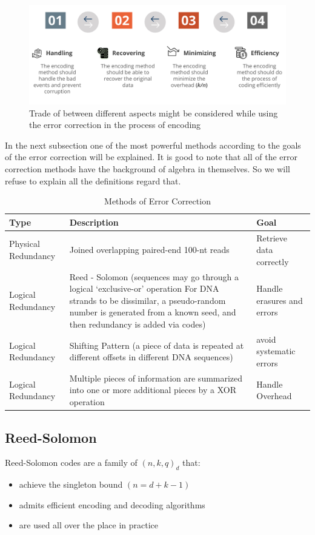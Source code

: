 \documentclass[10pt,twocolumn,twoside]{gsajnl}
\theoremstyle{definition}
\begin{document}
\begin{figure}[ht]
    \centering
    \includegraphics[width=\linewidth]{Figures/Encoding goals.png}
    \caption{Trade of between different aspects might be considered while using the error correction in the process of encoding}
    \label{fig5}
\end{figure}
In the next subsection one of the most powerful methods according to the goals of the error correction will be explained. It is good to note that all of the error correction methods have the background of algebra in themselves. So we will refuse to explain all the definitions regard that.
\begin{table}
\centering
\caption{Methods of Error Correction}
\begin{tableminipage}{\textwidth}
\begin{tabularx}{\textwidth}{@{}XXX@{}}
\hline
{\bf Type} & {\bf Description} & {\bf Goal}\\
\hline
Physical Redundancy & Joined overlapping paired-end 100-nt reads & Retrieve data correctly\\
Logical Redundancy & Reed - Solomon (sequences may go through a logical ‘exclusive-or’ operation For DNA strands to be dissimilar, a pseudo-random number is generated from a known seed, and then redundancy is added via codes)
 & Handle erasures and errors\\
Logical Redundancy & Shifting Pattern (a piece of data is repeated at different offsets in different DNA sequences) & avoid systematic errors
\\
Logical Redundancy & Multiple pieces of information are summarized into one or more additional pieces by a XOR operation & Handle Overhead
\\
\hline
\end{tabularx}
\label{tab:error correction}
\end{tableminipage}
\end{table}
\subsection{Reed-Solomon}
Reed-Solomon codes are a family of $(n,k,q)_{d}$ that:
\begin{itemize}
    \item achieve the singleton bound $(n=d+k-1)$
    \item admits efficient encoding and decoding algorithms
    \item are used all over the place in practice
\end{itemize}
\end{document}
